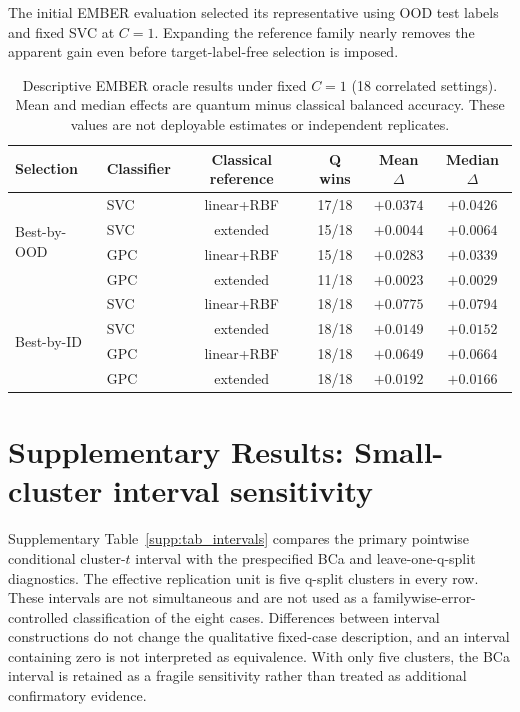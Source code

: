 \documentclass[11pt]{article}
\begin{document}
The initial EMBER evaluation selected its representative using OOD test
labels and fixed SVC at $C=1$. Expanding the reference family nearly removes
the apparent gain even before target-label-free selection is imposed.

\begin{table}[ht]
\centering
\caption{Descriptive EMBER oracle results under fixed $C=1$ (18 correlated
settings). Mean and median effects are quantum minus classical balanced
accuracy. These values are not deployable estimates or independent
replicates.}
\label{supp:tab_oracle}
\small
\begin{tabular}{llcccc}
\toprule
Selection & Classifier & Classical reference & Q wins & Mean $\Delta$ & Median $\Delta$ \\
\midrule
\multirow{4}{*}{Best-by-OOD}
 & SVC & linear+RBF & 17/18 & $+0.0374$ & $+0.0426$ \\
 & SVC & extended & 15/18 & $+0.0044$ & $+0.0064$ \\
 & GPC & linear+RBF & 15/18 & $+0.0283$ & $+0.0339$ \\
 & GPC & extended & 11/18 & $+0.0023$ & $+0.0029$ \\
\midrule
\multirow{4}{*}{Best-by-ID}
 & SVC & linear+RBF & 18/18 & $+0.0775$ & $+0.0794$ \\
 & SVC & extended & 18/18 & $+0.0149$ & $+0.0152$ \\
 & GPC & linear+RBF & 18/18 & $+0.0649$ & $+0.0664$ \\
 & GPC & extended & 18/18 & $+0.0192$ & $+0.0166$ \\
\bottomrule
\end{tabular}
\end{table}

\section*{Supplementary Results: Small-cluster interval sensitivity}
\label{supp:intervals}

Supplementary Table~\ref{supp:tab_intervals} compares the primary pointwise conditional
cluster-$t$ interval with the prespecified BCa and leave-one-q-split
diagnostics. The effective replication unit is five q-split clusters in every
row. These intervals are not simultaneous and are not used as a
familywise-error-controlled classification of the eight cases. Differences
between interval constructions do not change the qualitative fixed-case
description, and an interval containing zero is not interpreted as
equivalence. With only five clusters, the BCa interval is retained as a
fragile sensitivity rather than treated as additional confirmatory evidence.
\end{document}
